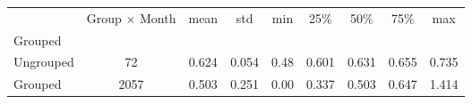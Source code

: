 \begin{tabular}{lcccccccc}
\toprule
{} &  Group $\times$ Month &   mean &    std &   min &    25\% &    50\% &    75\% &    max \\
Grouped   &                       &        &        &       &        &        &        &        \\
\midrule
Ungrouped &                    72 &  0.624 &  0.054 &  0.48 &  0.601 &  0.631 &  0.655 &  0.735 \\
Grouped   &                  2057 &  0.503 &  0.251 &  0.00 &  0.337 &  0.503 &  0.647 &  1.414 \\
\bottomrule
\end{tabular}
